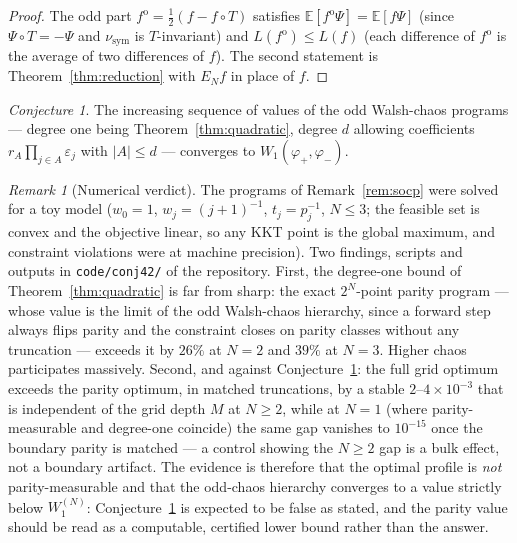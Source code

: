 \documentclass[11pt]{amsart}
\theoremstyle{remark}
\newtheorem{remark}[theorem]{Remark}
\newtheorem{conjecture}[theorem]{Conjecture}
\newcommand{\E}{\mathbb{E}}
\newcommand{\Lip}{L}
\begin{document}
\begin{proof}
The odd part $f^{\mathrm o}=\tfrac12(f-f\circ T)$ satisfies
$\E[f^{\mathrm o}\Psi]=\E[f\Psi]$ (since $\Psi\circ T=-\Psi$ and $\nu_{\mathrm{sym}}$ is
$T$-invariant) and $\Lip(f^{\mathrm o})\le\Lip(f)$ (each difference of $f^{\mathrm o}$ is
the average of two differences of $f$). The second statement is
Theorem~\ref{thm:reduction} with $E_Nf$ in place of $f$.
\end{proof}

\begin{conjecture}\label{conj:hierarchy}
The increasing sequence of values of the odd Walsh-chaos programs --- degree one being
Theorem~\ref{thm:quadratic}, degree $d$ allowing coefficients
$r_A\prod_{j\in A}\varepsilon_j$ with $|A|\le d$ --- converges to $W_1(\varphi_+,\varphi_-)$.
\end{conjecture}

\begin{remark}[Numerical verdict]\label{rem:numerics}
The programs of Remark~\ref{rem:socp} were solved for a toy model ($w_0=1$,
$w_j=(j+1)^{-1}$, $t_j=p_j^{-1}$, $N\le3$; the feasible set is convex and the objective
linear, so any KKT point is the global maximum, and constraint violations were at machine
precision). Two findings, scripts and outputs in \texttt{code/conj42/} of the repository.
First, the degree-one bound of Theorem~\ref{thm:quadratic} is far from sharp: the exact
$2^N$-point parity program --- whose value is the limit of the odd Walsh-chaos hierarchy,
since a forward step always flips parity and the constraint closes on parity classes
without any truncation --- exceeds it by $26\%$ at $N=2$ and $39\%$ at $N=3$. Higher
chaos participates massively. Second, and against Conjecture~\ref{conj:hierarchy}: the
full grid optimum exceeds the parity optimum, in matched truncations, by a stable
$2$--$4\times10^{-3}$ that is independent of the grid depth $M$ at $N\ge2$, while at
$N=1$ (where parity-measurable and degree-one coincide) the same gap vanishes to
$10^{-15}$ once the boundary parity is matched --- a control showing the $N\ge2$ gap is a
bulk effect, not a boundary artifact. The evidence is therefore that the optimal profile
is \emph{not} parity-measurable and that the odd-chaos hierarchy converges to a value
strictly below $W_1^{(N)}$: Conjecture~\ref{conj:hierarchy} is expected to be false as
stated, and the parity value should be read as a computable, certified lower bound rather
than the answer.
\end{remark}
\end{document}
